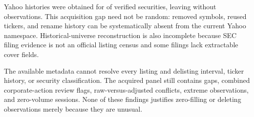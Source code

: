 
Yahoo histories were obtained for \YahooSuccess{{}} of \YahooAttempted{{}} verified securities, leaving \YahooFailed{{}} without observations. This acquisition gap need not be random: removed symbols, reused tickers, and rename history can be systematically absent from the current Yahoo namespace. Historical-universe reconstruction is also incomplete because SEC filing evidence is not an official listing census and some filings lack extractable cover fields.

The available metadata cannot resolve every listing and delisting interval, ticker history, or security classification. The acquired panel still contains gaps, combined corporate-action review flags, raw-versus-adjusted conflicts, extreme observations, and zero-volume sessions. None of these findings justifies zero-filling or deleting observations merely because they are unusual.
